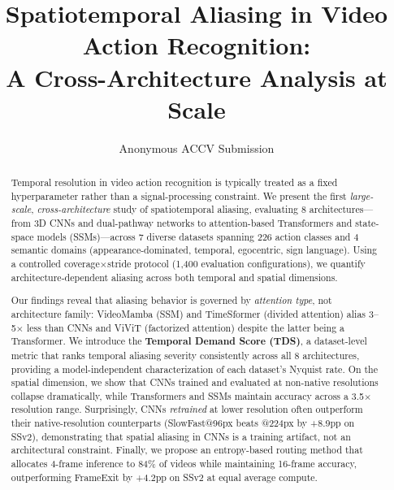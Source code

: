 \documentclass[runningheads]{llncs}
\newcommand{\TDS}{\textsc{TDS}}
\begin{document}
\title{Spatiotemporal Aliasing in Video Action Recognition:\\
       A Cross-Architecture Analysis at Scale}


\author{Anonymous ACCV Submission}
\institute{}

\maketitle

\begin{abstract}
Temporal resolution in video action recognition is typically treated as a
fixed hyperparameter rather than a signal-processing constraint.
We present the first \emph{large-scale}, \emph{cross-architecture} study of
spatiotemporal aliasing, evaluating 8 architectures—from 3D CNNs and dual-pathway
networks to attention-based Transformers and state-space models (SSMs)—across
7 diverse datasets spanning 226 action classes and 4 semantic domains
(appearance-dominated, temporal, egocentric, sign language).
Using a controlled coverage$\times$stride protocol (1,400 evaluation configurations),
we quantify architecture-dependent aliasing across both temporal and spatial dimensions.

Our findings reveal that aliasing behavior is governed by \emph{attention type},
not architecture family: VideoMamba (SSM) and TimeSformer (divided attention)
alias 3--5$\times$ less than CNNs and ViViT (factorized attention) despite the
latter being a Transformer. We introduce the \textbf{Temporal Demand Score
(\TDS{})}, a dataset-level metric that ranks temporal aliasing severity
consistently across all 8 architectures, providing a model-independent
characterization of each dataset's Nyquist rate.
On the spatial dimension, we show that CNNs trained and evaluated at
non-native resolutions collapse dramatically, while Transformers and SSMs
maintain accuracy across a 3.5$\times$ resolution range.
Surprisingly, CNNs \emph{retrained} at lower resolution often outperform their
native-resolution counterparts (SlowFast@96px beats @224px by +8.9pp on SSv2),
demonstrating that spatial aliasing in CNNs is a training artifact, not an
architectural constraint.
Finally, we propose an entropy-based routing method that allocates 4-frame
inference to 84\% of videos while maintaining 16-frame accuracy, outperforming
FrameExit by +4.2pp on SSv2 at equal average compute.
\end{abstract}
\end{document}
